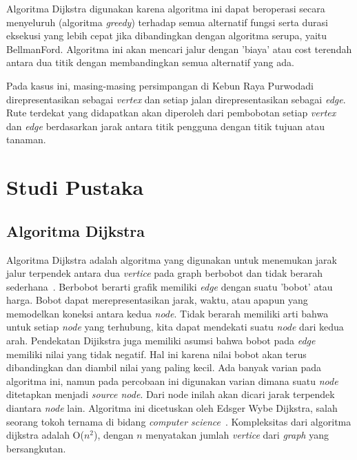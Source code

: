 \documentclass[conference]{IEEEtran}
\begin{document}
Algoritma Dijkstra digunakan karena algoritma ini dapat
beroperasi secara menyeluruh (algoritma \textit{greedy}) terhadap
semua alternatif fungsi serta durasi eksekusi yang lebih cepat
jika dibandingkan dengan algoritma serupa, yaitu BellmanFord. Algoritma ini akan mencari jalur dengan ’biaya’ atau
cost terendah antara dua titik dengan membandingkan semua
alternatif yang ada.

Pada kasus ini, masing-masing persimpangan di Kebun
Raya Purwodadi direpresentasikan sebagai \textit{vertex} dan setiap
jalan direpresentasikan sebagai \textit{edge}. Rute terdekat yang didapatkan akan diperoleh dari pembobotan setiap \textit{vertex} dan \textit{edge}
berdasarkan jarak antara titik pengguna dengan titik tujuan
atau tanaman.

	\section{Studi Pustaka}
	\subsection{Algoritma Dijkstra}
Algoritma Dijkstra adalah algoritma yang digunakan untuk
menemukan jarak jalur terpendek antara dua \textit{vertice} pada
graph berbobot dan tidak berarah sederhana~\cite{ref2}. Berbobot
berarti grafik memiliki \textit{edge} dengan suatu ’bobot’ atau harga.
Bobot dapat merepresentasikan jarak, waktu, atau apapun
yang memodelkan koneksi antara kedua \textit{node}. Tidak berarah
memiliki arti bahwa untuk setiap \textit{node} yang terhubung, kita
dapat mendekati suatu \textit{node} dari kedua arah. Pendekatan Dijikstra juga memiliki asumsi bahwa bobot pada \textit{edge} memiliki
nilai yang tidak negatif. Hal ini karena nilai bobot akan
terus dibandingkan dan diambil nilai yang paling kecil. Ada
banyak varian pada algoritma ini, namun pada percobaan
ini digunakan varian dimana suatu \textit{node} ditetapkan menjadi
\textit{source node}. Dari node inilah akan dicari jarak terpendek
diantara \textit{node} lain. Algoritma ini dicetuskan oleh Edsger
Wybe Dijkstra, salah seorang tokoh ternama di bidang \textit{computer science}~\cite{ref3}. Kompleksitas dari algoritma dijkstra adalah O(\begin{math} n^2 \end{math}), dengan \begin{math} n \end{math} menyatakan jumlah \textit{vertice} dari \textit{graph} yang
bersangkutan.
\end{document}
